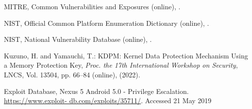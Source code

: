\documentclass[english,sigrecommended,JIP]{ipsj}
\begin{document}




















\begin{thebibliography}{99}


    MITRE, Common Vulnerabilities and Exposures (online),
      .
    
    NIST, Official Common Platform Enumeration Dictionary (online), 
      .    


    NIST,  National Vulnerability Database (online),
     .    

  
    Kuzuno, H. and Yamauchi, T.: KDPM: Kernel Data Protection Mechanism Using a Memory Protection Key,
    \textit{Proc. the 17th International Workshop on Security}, LNCS, Vol. 13504, pp. 66--84 (online),
     (2022).    

  Exploit Database, Nexus 5 Android 5.0 - Privilege Escalation. \url{https://www.exploit- db.com/exploits/35711/}. Accessed 21 May 2019    


\end{thebibliography}
\end{document}
